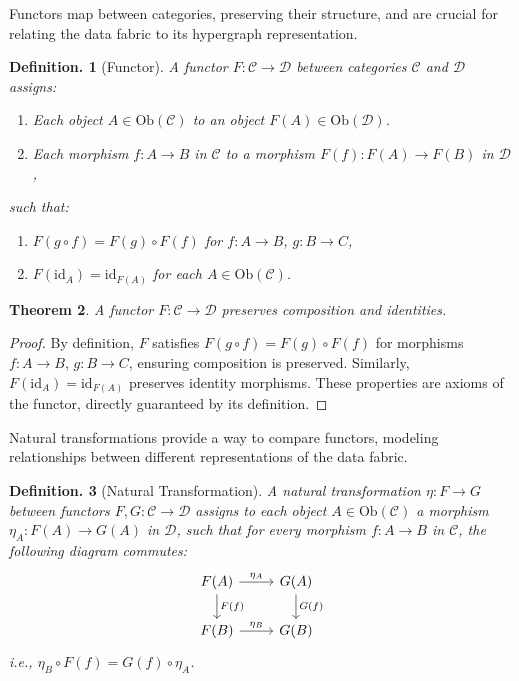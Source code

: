\documentclass{amsart}
\newtheorem{thm}{Theorem}
\newtheorem{defn}[thm]{Definition.}
\begin{document}
Functors map between categories, preserving their structure, and are crucial for relating the data fabric to its hypergraph representation.

\begin{defn}[Functor]
A \emph{functor} \( F: \mathcal{C} \to \mathcal{D} \) between categories \( \mathcal{C} \) and \( \mathcal{D} \) assigns:
\begin{enumerate}
    \item Each object \( A \in \text{Ob}(\mathcal{C}) \) to an object \( F(A) \in \text{Ob}(\mathcal{D}) \).
    \item Each morphism \( f: A \to B \) in \( \mathcal{C} \) to a morphism \( F(f): F(A) \to F(B) \) in \( \mathcal{D} \),
\end{enumerate}
such that:
\begin{enumerate}
    \item \( F(g \circ f) = F(g) \circ F(f) \) for \( f: A \to B \), \( g: B \to C \),
    \item \( F(\text{id}_A) = \text{id}_{F(A)} \) for each \( A \in \text{Ob}(\mathcal{C}) \).
\end{enumerate}
\end{defn}

\begin{thm}
A functor \( F: \mathcal{C} \to \mathcal{D} \) preserves composition and identities.
\end{thm}

\begin{proof}
By definition, \( F \) satisfies \( F(g \circ f) = F(g) \circ F(f) \) for morphisms \( f: A \to B \), \( g: B \to C \), ensuring composition is preserved. Similarly, \( F(\text{id}_A) = \text{id}_{F(A)} \) preserves identity morphisms. These properties are axioms of the functor, directly guaranteed by its definition.
\end{proof}

Natural transformations provide a way to compare functors, modeling relationships between different representations of the data fabric.

\begin{defn}[Natural Transformation]
A \emph{natural transformation} \( \eta: F \to G \) between functors \( F, G: \mathcal{C} \to \mathcal{D} \) assigns to each object \( A \in \text{Ob}(\mathcal{C}) \) a morphism \( \eta_A: F(A) \to G(A) \) in \( \mathcal{D} \), such that for every morphism \( f: A \to B \) in \( \mathcal{C} \), the following diagram commutes:
\[
\begin{tikzcd}
F(A) \arrow[r, "\eta_A"] \arrow[d, "F(f)"] & G(A) \arrow[d, "G(f)"] \\
F(B) \arrow[r, "\eta_B"] & G(B)
\end{tikzcd}
\]
i.e., \( \eta_B \circ F(f) = G(f) \circ \eta_A \).
\end{defn}
\end{document}
